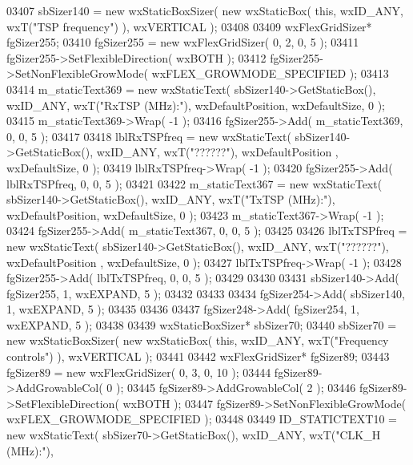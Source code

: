 \begin{DoxyCode}
03407     sbSizer140 = \textcolor{keyword}{new} wxStaticBoxSizer( \textcolor{keyword}{new} wxStaticBox( \textcolor{keyword}{this}, wxID\_ANY, wxT(\textcolor{stringliteral}{"TSP frequency"}) ), wxVERTICAL 
      );
03408     
03409     wxFlexGridSizer* fgSizer255;
03410     fgSizer255 = \textcolor{keyword}{new} wxFlexGridSizer( 0, 2, 0, 5 );
03411     fgSizer255->SetFlexibleDirection( wxBOTH );
03412     fgSizer255->SetNonFlexibleGrowMode( wxFLEX\_GROWMODE\_SPECIFIED );
03413     
03414     m_staticText369 = \textcolor{keyword}{new} wxStaticText( sbSizer140->GetStaticBox(), wxID\_ANY, wxT(\textcolor{stringliteral}{"RxTSP (MHz):"}), 
      wxDefaultPosition, wxDefaultSize, 0 );
03415     m_staticText369->Wrap( -1 );
03416     fgSizer255->Add( m_staticText369, 0, 0, 5 );
03417     
03418     lblRxTSPfreq = \textcolor{keyword}{new} wxStaticText( sbSizer140->GetStaticBox(), wxID\_ANY, wxT(\textcolor{stringliteral}{"??????"}), wxDefaultPosition
      , wxDefaultSize, 0 );
03419     lblRxTSPfreq->Wrap( -1 );
03420     fgSizer255->Add( lblRxTSPfreq, 0, 0, 5 );
03421     
03422     m_staticText367 = \textcolor{keyword}{new} wxStaticText( sbSizer140->GetStaticBox(), wxID\_ANY, wxT(\textcolor{stringliteral}{"TxTSP (MHz):"}), 
      wxDefaultPosition, wxDefaultSize, 0 );
03423     m_staticText367->Wrap( -1 );
03424     fgSizer255->Add( m_staticText367, 0, 0, 5 );
03425     
03426     lblTxTSPfreq = \textcolor{keyword}{new} wxStaticText( sbSizer140->GetStaticBox(), wxID\_ANY, wxT(\textcolor{stringliteral}{"??????"}), wxDefaultPosition
      , wxDefaultSize, 0 );
03427     lblTxTSPfreq->Wrap( -1 );
03428     fgSizer255->Add( lblTxTSPfreq, 0, 0, 5 );
03429     
03430     
03431     sbSizer140->Add( fgSizer255, 1, wxEXPAND, 5 );
03432     
03433     
03434     fgSizer254->Add( sbSizer140, 1, wxEXPAND, 5 );
03435     
03436     
03437     fgSizer248->Add( fgSizer254, 1, wxEXPAND, 5 );
03438     
03439     wxStaticBoxSizer* sbSizer70;
03440     sbSizer70 = \textcolor{keyword}{new} wxStaticBoxSizer( \textcolor{keyword}{new} wxStaticBox( \textcolor{keyword}{this}, wxID\_ANY, wxT(\textcolor{stringliteral}{"Frequency controls"}) ), 
      wxVERTICAL );
03441     
03442     wxFlexGridSizer* fgSizer89;
03443     fgSizer89 = \textcolor{keyword}{new} wxFlexGridSizer( 0, 3, 0, 10 );
03444     fgSizer89->AddGrowableCol( 0 );
03445     fgSizer89->AddGrowableCol( 2 );
03446     fgSizer89->SetFlexibleDirection( wxBOTH );
03447     fgSizer89->SetNonFlexibleGrowMode( wxFLEX\_GROWMODE\_SPECIFIED );
03448     
03449     ID_STATICTEXT10 = \textcolor{keyword}{new} wxStaticText( sbSizer70->GetStaticBox(), wxID\_ANY, wxT(\textcolor{stringliteral}{"CLK\_H (MHz):"}), 

\end{DoxyCode}
